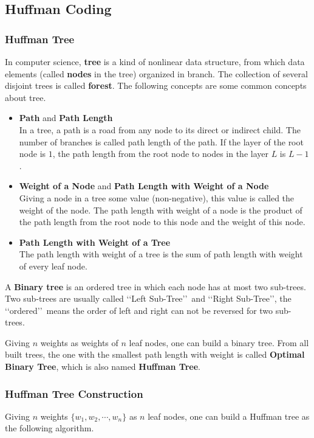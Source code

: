\subsection{Huffman Coding}

\subsubsection{Huffman Tree}
In computer science, \textbf{tree} is a kind of nonlinear data structure, from which data elements (called \textbf{nodes} in the tree) organized in branch. The collection of several disjoint trees is called \textbf{forest}. The following concepts are some common concepts about tree.
\begin{itemize}
\item \textbf{Path} and \textbf{Path Length}\\
In a tree, a path is a road from any node to its direct or indirect child. The number of branches is called path length of the path. If the layer of the root node is $1$, the path length from the root node to nodes in the layer $L$ is $L-1$.
\item \textbf{Weight of a Node} and \textbf{Path Length with Weight of a Node}\\
Giving a node in a tree some value (non-negative), this value is called the weight of the node. The path length with weight of a node is the product of the path length from the root node to this node and the weight of this node.
\item \textbf{Path Length with Weight of a Tree}\\
The path length with weight of a tree is the sum of path length with weight of every leaf node.
\end{itemize}

A \textbf{Binary tree} is an ordered tree in which each node has at most two sub-trees. Two sub-trees are usually called \lq\lq Left Sub-Tree\rq\rq\ and \lq\lq Right Sub-Tree\rq\rq , the \lq\lq ordered\rq\rq\ means the order of left and right can not be reversed for two sub-trees.

Giving $n$ weights as weights of $n$ leaf nodes, one can build a binary tree. From all built trees, the one with the smallest path length with weight is called \textbf{Optimal Binary Tree}, which is also named \textbf{Huffman Tree}.
\subsubsection{Huffman Tree Construction}
Giving $n$ weights $\{w_1,w_2,\cdots,w_n\}$ as $n$ leaf nodes, one can build a Huffman tree as the following algorithm.\\

